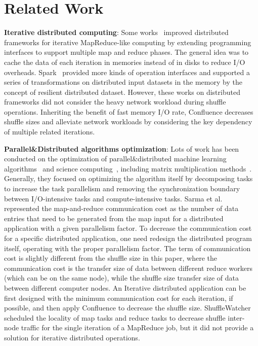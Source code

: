 \documentclass[10pt,journal,compsoc]{IEEEtran}
\begin{document}
\section{Related Work}\label{section:relatedWork}
\textbf{Iterative distributed computing}: 
Some works~\cite{gunarathne2013scalable, bu2010haloop, ekanayake2010twister} improved distributed frameworks for iterative MapReduce-like computing by extending programming interfaces to support multiple map and reduce phases. 
The general idea was to cache the data of each iteration in memories instead of in disks to reduce I/O overheads.
Spark~\cite{zaharia2012resilient} provided more kinds of operation interfaces and supported a series of transformations on distributed input datasets in the memory by the concept of resilient distributed dataset. 
However, these works on distributed frameworks did not consider the heavy network workload during shuffle operations. 
Inheriting the benefit of fast memory I/O rate, Confluence decreases shuffle sizes and alleviate network workloads by considering the key dependency of multiple related iterations. 

\textbf{Parallel\&Distributed algorithms optimization}: Lots of work has been conducted on the optimization of parallel\&distributed machine learning algorithms~\cite{bekkerman2011scaling} and science computing~\cite{kiran2013verification, mensink2012metric}, including matrix multiplication methods~\cite{buluc2012parallel, ballard2012communication}. 
Generally, they focused on optimizing the algorithm itself by decomposing tasks to increase the task parallelism and removing the synchronization boundary between I/O-intensive tasks and compute-intensive tasks. 
Sarma et al.~\cite{Sarma:2013:ULB} represented the map-and-reduce communication cost as the number of data entries that need to be generated from the map input for a distributed application with a given parallelism factor. 
To decrease the communication cost for a specific distributed application, one need redesign the distributed program itself, operating with the proper parallelism factor. 
The term of communication cost is slightly different from the shuffle size in this paper, where the communication cost is the transfer size of data between different reduce workers (which can be on the same node), while the shuffle size transfer size of data between different computer nodes. 
An Iterative distributed application can be first designed with the minimum communication cost for each iteration, if possible, and then apply Confluence to decrease the shuffle size.
ShuffleWatcher~\cite{faraz2014shufflewatcher} scheduled the locality of map tasks and reduce tasks to decrease shuffle inter-node traffic for the single 
iteration of a MapReduce job, but it did not provide a solution for iterative distributed operations. 
\end{document}
